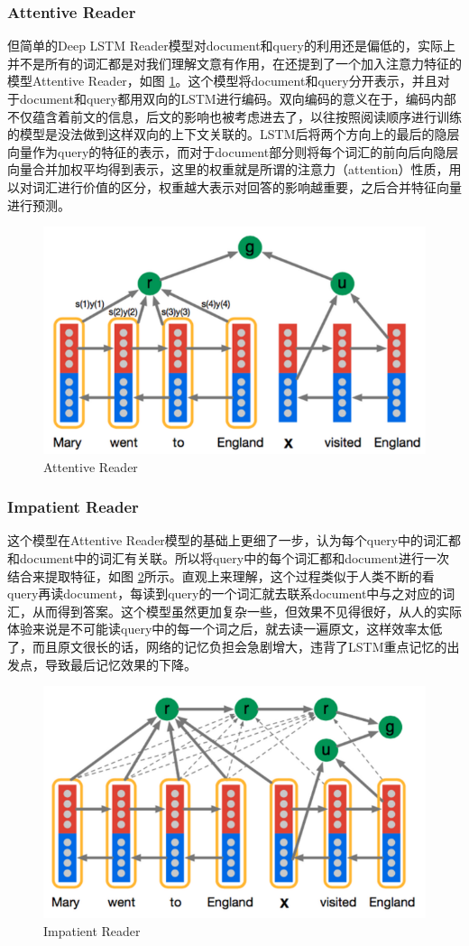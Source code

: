 \documentclass[10pt, titlepage]{article}
\begin{document}
		\subsubsection{Attentive Reader}
		但简单的Deep LSTM Reader模型对document和query的利用还是偏低的，实际上并不是所有的词汇都是对我们理解文意有作用，在\cite{hermann2015teaching}还提到了一个加入注意力特征的模型Attentive Reader，如图 \ref{fig:AttentiveReader}。这个模型将document和query分开表示，并且对于document和query都用双向的LSTM进行编码。双向编码的意义在于，编码内部不仅蕴含着前文的信息，后文的影响也被考虑进去了，以往按照阅读顺序进行训练的模型是没法做到这样双向的上下文关联的。LSTM后将两个方向上的最后的隐层向量作为query的特征的表示，而对于document部分则将每个词汇的前向后向隐层向量合并加权平均得到表示，这里的权重就是所谓的注意力（attention）性质，用以对词汇进行价值的区分，权重越大表示对回答的影响越重要，之后合并特征向量进行预测。
			\begin{figure}[htb]
			\centering
			\includegraphics[width=0.6\columnwidth]{figs/2.png}
			\caption{Attentive Reader}
			\label{fig:AttentiveReader}
			\end{figure}

		\subsubsection{Impatient Reader}
		这个模型在Attentive Reader模型的基础上更细了一步，认为每个query中的词汇都和document中的词汇有关联。所以将query中的每个词汇都和document进行一次结合来提取特征，如图 \ref{fig:ImpatientReader}所示。直观上来理解，这个过程类似于人类不断的看query再读document，每读到query的一个词汇就去联系document中与之对应的词汇，从而得到答案。这个模型虽然更加复杂一些，但效果不见得很好，从人的实际体验来说是不可能读query中的每一个词之后，就去读一遍原文，这样效率太低了，而且原文很长的话，网络的记忆负担会急剧增大，违背了LSTM重点记忆的出发点，导致最后记忆效果的下降。
			\begin{figure}[htb]
			\centering
			\includegraphics[width=0.6\columnwidth]{figs/3.png}
			\caption{Impatient Reader}
			\label{fig:ImpatientReader}
			\end{figure}
\end{document}
